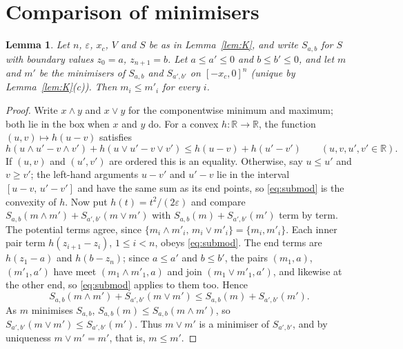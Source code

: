\documentclass[11pt,a4paper]{article}
\newtheorem{lemma}[theorem]{Lemma}
\theoremstyle{definition}
\theoremstyle{remark}
\newcommand{\R}{\mathbb{R}}
\newcommand{\xc}{x_c}
\begin{document}
\section{Comparison of minimisers}\label{app:CMP}

\begin{lemma}\label{lem:CMP}
Let $n$, $\varepsilon$, $\xc$, $V$ and $S$ be as in Lemma~\ref{lem:K}, and write $S_{a,b}$ for $S$ with boundary values $z_0=a$, $z_{n+1}=b$. Let $a\le a'\le0$ and $b\le b'\le0$, and let $m$ and $m'$ be the minimisers of $S_{a,b}$ and $S_{a',b'}$ on $[-\xc,0]^n$ \textup{(}unique by Lemma~\ref{lem:K}(c)\textup{)}. Then $m_i\le m'_i$ for every $i$.
\end{lemma}

\begin{proof}
Write $x\wedge y$ and $x\vee y$ for the componentwise minimum and maximum; both lie in the box when $x$ and $y$ do. For a convex $h:\R\to\R$, the function $(u,v)\mapsto h(u-v)$ satisfies
\begin{equation}\label{eq:submod}
h(u\wedge u'-v\wedge v')+h(u\vee u'-v\vee v')\le h(u-v)+h(u'-v')\qquad(u,v,u',v'\in\R).
\end{equation}
If $(u,v)$ and $(u',v')$ are ordered this is an equality. Otherwise, say $u\le u'$ and $v\ge v'$; the left-hand arguments $u-v'$ and $u'-v$ lie in the interval $[u-v,\,u'-v']$ and have the same sum as its end points, so \eqref{eq:submod} is the convexity of $h$. Now put $h(t)=t^2/(2\varepsilon)$ and compare $S_{a,b}(m\wedge m')+S_{a',b'}(m\vee m')$ with $S_{a,b}(m)+S_{a',b'}(m')$ term by term. The potential terms agree, since $\{m_i\wedge m'_i,\,m_i\vee m'_i\}=\{m_i,m'_i\}$. Each inner pair term $h(z_{i+1}-z_i)$, $1\le i<n$, obeys \eqref{eq:submod}. The end terms are $h(z_1-a)$ and $h(b-z_n)$; since $a\le a'$ and $b\le b'$, the pairs $(m_1,a)$, $(m'_1,a')$ have meet $(m_1\wedge m'_1,a)$ and join $(m_1\vee m'_1,a')$, and likewise at the other end, so \eqref{eq:submod} applies to them too. Hence
\[
S_{a,b}(m\wedge m')+S_{a',b'}(m\vee m')\le S_{a,b}(m)+S_{a',b'}(m').
\]
As $m$ minimises $S_{a,b}$, $S_{a,b}(m)\le S_{a,b}(m\wedge m')$, so $S_{a',b'}(m\vee m')\le S_{a',b'}(m')$. Thus $m\vee m'$ is a minimiser of $S_{a',b'}$, and by uniqueness $m\vee m'=m'$, that is, $m\le m'$.
\end{proof}
\end{document}
